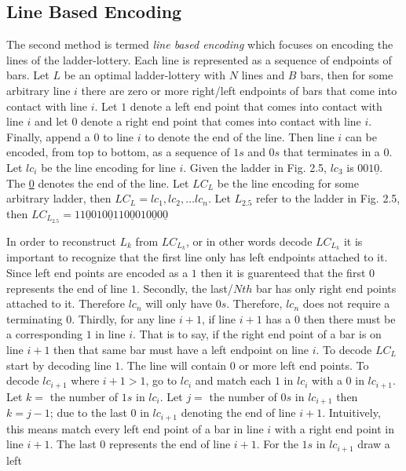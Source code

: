 \subsection{Line Based Encoding}
The second method is termed \emph{line based encoding} which focuses 
on encoding the lines of the ladder-lottery. Each line is represented 
as a sequence of endpoints of bars. Let $L$ be an optimal ladder-lottery 
with $N$ lines and $B$ bars, then for some arbitrary line $i$ there 
are zero or more right/left endpoints of bars that 
come into contact with line $i$. Let $1$ denote a left end point that 
comes into contact with line $i$ and let $0$ denote a right 
end point that comes into contact with line $i$. Finally, append a $0$
to line $i$ to denote the end of the line. Then line $i$ can be 
encoded, from top to bottom, as a sequence of $1s$ and $0s$ that 
terminates in a $0$. Let $lc_{i}$ be 
the line encoding for line $i$. Given the ladder in Fig. 2.5, 
$lc_{3}$ is $001\underline{0}$. The \underline{0} denotes 
the end of the line. Let $LC_{L}$ be the line encoding for 
some arbitrary ladder, then $LC_{L}=lc_{1}, lc_{2}, \dots lc_{n}$.
Let $L_{2.5}$ refer to the ladder in Fig. 2.5, then 
$LC_{L_{2.5}}=11\underline{0}010\underline{0}110\underline{0}010\underline{0}0\underline{0}$\par 
In order to reconstruct $L_{k}$ from $LC_{L_{k}}$, or in other words decode
$LC_{L_{k}}$ it is important to recognize that the first line only has left endpoints attached to it. Since left 
end points are encoded as a $1$ then it is guarenteed that the first $0$ 
represents the end of line $1$. Secondly, the last/$Nth$ bar 
has only right end points attached to it.  Therefore $lc_{n}$ will only have $0s$. Therefore, $lc_{n}$
does not require a terminating $0$. Thirdly, for any 
line $i+1$, if line $i+1$ has a $0$ then there must be a corresponding $1$
in line $i$. That is to say, if the right end point of a bar is on line 
$i+1$ then that same bar must have a left endpoint on line $i$. To decode 
$LC_{L}$ start by decoding line $1$. The line will contain $0$ or more 
left end points. To decode $lc_{i+1}$ where $i+1>1$, go to 
$lc_{i}$ and match each $1$ in $lc_{i}$ with a $0$ in $lc_{i+1}$. 
Let $k=$ the number of $1s$ in $lc_{i}$. Let $j=$ the number 
of $0s$ in $lc_{i+1}$ then $k=j-1$; due to the last $0$ in $lc_{i+1}$ denoting 
the end of line $i+1$.  Intuitively, this means match every left end point 
of a bar in line $i$ with a right end point in line $i+1$. The last $0$
represents the end of line $i+1$. For the $1s$ in $lc_{i+1}$ draw a left 
